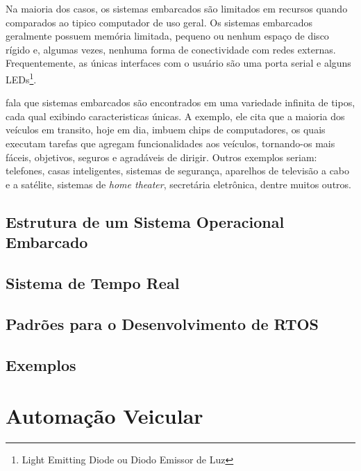 Na maioria dos casos, os sistemas embarcados são limitados em recursos quando comparados ao tipico computador de uso geral. Os sistemas embarcados geralmente possuem memória limitada, pequeno ou nenhum espaço de disco rígido e, algumas vezes, nenhuma forma de conectividade com redes externas. Frequentemente, as únicas interfaces com o usuário são uma porta serial e alguns LEDs\footnote{Light Emitting Diode ou Diodo Emissor de Luz}\cite{hallinan}.

 fala que sistemas embarcados são encontrados em uma variedade infinita de tipos, cada qual exibindo caracteristicas únicas. A exemplo, ele cita que a maioria dos veículos em transito, hoje em dia, imbuem chips de computadores, os quais executam tarefas que agregam funcionalidades aos veículos, tornando-os mais fáceis, objetivos, seguros e agradáveis de dirigir. Outros exemplos seriam: telefones, casas inteligentes, sistemas de segurança, aparelhos de televisão a cabo e a satélite, sistemas de \emph{home theater}, secretária eletrônica, dentre muitos outros.

\section{Estrutura de um Sistema Operacional Embarcado}

\section{Sistema de Tempo Real}

\section{Padrões para o Desenvolvimento de RTOS}

\section{Exemplos}

\chapter{Automação Veicular}
\label{cap:automacao_veicular}

